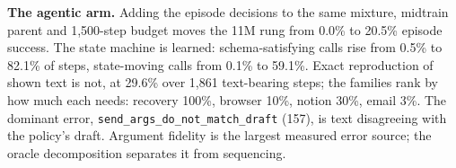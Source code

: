 \documentclass{article}
\begin{document}
\textbf{The agentic arm.} Adding the episode decisions to the same mixture, midtrain parent and 1,500-step budget moves the 11M rung from 0.0\% to 20.5\% episode success. The state machine is learned: schema-satisfying calls rise from 0.5\% to 82.1\% of steps, state-moving calls from 0.1\% to 59.1\%. Exact reproduction of shown text is not, at 29.6\% over 1,861 text-bearing steps; the families rank by how much each needs: recovery 100\%, browser 10\%, notion 30\%, email 3\%. The dominant error, \texttt{send\_args\_do\_not\_match\_draft} (157), is text disagreeing with the policy's draft. Argument fidelity is the largest measured error source; the oracle decomposition separates it from sequencing.
\clearpage

\end{document}
